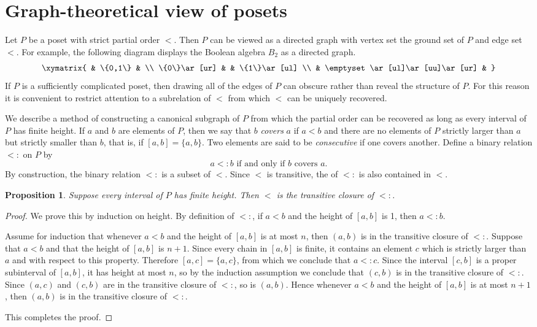 \documentclass[12pt]{article}
\newtheorem*{proposition*}{Proposition}
\theoremstyle{definition}
\begin{document}
\section*{Graph-theoretical view of posets}

Let $P$ be a poset with strict partial order $<$.  Then $P$ can be
viewed as a directed graph with vertex set the ground set of $P$ and
edge set $<$.  For example, the following diagram displays the Boolean
algebra $B_2$ as a directed graph.
\[\xymatrix{
             & \{0,1\}                        &              \\
\{0\}\ar[ur] &                                & \{1\}\ar[ul] \\
             & \emptyset\ar[ul]\ar[uu]\ar[ur] &
}\]
If $P$ is a sufficiently complicated poset, then drawing all of the
edges of $P$ can obscure rather than reveal the structure of $P$.  For
this reason it is convenient to restrict attention to a subrelation of
$<$ from which $<$ can be uniquely recovered.  

We describe a method of constructing a canonical subgraph of $P$ from
which the partial order can be recovered as long as every interval of
$P$ has finite height.  If $a$ and $b$ are elements of $P$, then we
say that $b$ \emph{covers} $a$ if $a<b$ and there are no elements of
$P$ strictly larger than $a$ but strictly smaller than $b$, that is, if
$[a,b]=\{a,b\}$.  Two elements are said to be \emph{consecutive} if 
one covers another.  Define a binary relation $<:$ on $P$ by
\[
a <: b \text{\ if and only if $b$ covers $a$.}
\]
By construction, the binary relation $<:$ is a subset of $<$.  Since
$<$ is transitive, the  of $<:$ is also contained in $<$.

\begin{proposition*}
Suppose every interval of $P$ has finite height.  Then $<$ is the
transitive closure of $<:$.
\end{proposition*}

\begin{proof}
We prove this by induction on height.  By definition of $<:$, if $a<b$
and the height of $[a,b]$ is 1, then $a<:b$.

Assume for induction that whenever $a<b$ and the height of $[a,b]$ is
at most $n$, then $(a,b)$ is in the transitive closure of $<:$.
Suppose that $a<b$ and that the height of $[a,b]$ is $n+1$.  Since
every chain in $[a,b]$ is finite, it contains an element $c$ which is
strictly larger than $a$ and  with
respect to this property.  Therefore $[a,c]=\{a,c\}$, from which we
conclude that $a<:c$.  Since the interval $[c,b]$ is a proper
subinterval of $[a,b]$, it has height at most $n$, so by the induction
assumption we conclude that $(c,b)$ is in the transitive closure of
$<:$.  Since $(a,c)$ and $(c,b)$ are in the transitive closure of
$<:$, so is $(a,b)$.  Hence whenever $a<b$ and the height of $[a,b]$
is at most $n+1$, then $(a,b)$ is in the transitive closure of $<:$.

This completes the proof.
\end{proof}
\end{document}
